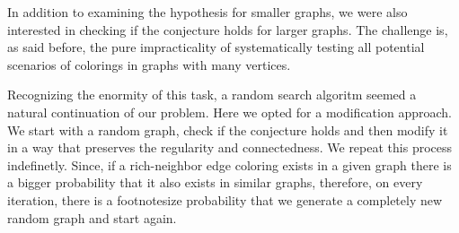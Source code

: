 \documentclass[12pt,a4paper]{amsart}
\theoremstyle{definition} %
\theoremstyle{plain} %
\begin{document}
    In addition to examining the hypothesis for smaller graphs, we were also interested in checking if the conjecture holds for larger graphs. The challenge is, as said before, the pure impracticality of systematically testing all potential scenarios of colorings in graphs with many vertices.

    Recognizing the enormity of this task, a random search algoritm seemed a natural continuation of our problem. Here we opted for a modification approach.\\

    We start with a random graph, check if the conjecture holds and then 
    modify it in a way that preserves the regularity and connectedness. We repeat this process indefinetly. Since, if a rich-neighbor edge coloring exists in a given graph there is a bigger probability that it also exists in similar graphs, therefore, on every iteration, there is a footnotesize probability that we generate a completely new random graph and start again.  

\end{document}
